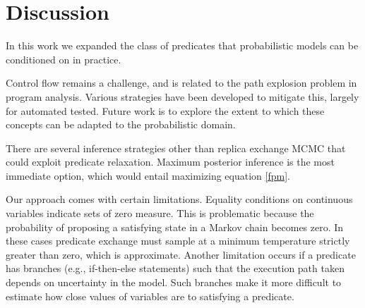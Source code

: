 \section{Discussion}
In this work we expanded the class of predicates that probabilistic models can be conditioned on in practice.

Control flow remains a challenge, and is related to the path explosion problem in program analysis.
Various strategies have been developed \cite{cadar2008exe, sen2005cute} to mitigate this, largely for automated tested.
Future work is to explore the extent to which these concepts can be adapted to the probabilistic domain.

There are several inference strategies other than replica exchange MCMC that could exploit predicate relaxation.
Maximum posterior inference is the most immediate option, which would entail maximizing equation \ref{fpm}.


Our approach comes with certain limitations.
Equality conditions on continuous variables indicate sets of zero measure.
This is problematic because the probability of proposing a satisfying state in a Markov chain becomes zero.
In these cases predicate exchange must sample at a minimum temperature strictly greater than zero, which is approximate.
Another limitation occurs if a predicate has branches (e.g., if-then-else statements) such that the execution path taken depends on uncertainty in the model.
Such branches make it more difficult to estimate how close values of variables are to satisfying a predicate.
